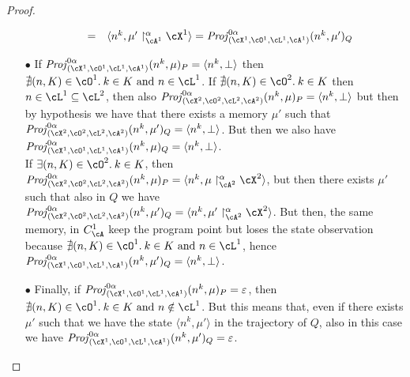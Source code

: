 \documentclass[prodmode,acmtocl]{acmsmall}
\newcommand{\caX}{\cX}
\def\prog{\ensuremath{P}\xspace}
\def\progq{\ensuremath{Q}\xspace}
\def\memory{\ensuremath{\mu}\xspace}
\def\crit{\ensuremath{C}\xspace}
\newcommand{\ABSMEM}[3]{#1 \upharpoonright^\alpha_{#3} #2}
\def\Proj{\ensuremath{\mathit{Proj}}\xspace}
\def\tuple#1{\langle #1 \rangle}
\newcommand{\0}{\mbox{\bf 0}}
\begin{document}
\begin{proof}
\begin{itemize}
\[\begin{array}{lll}
    &=&\tuple{n^k,\ABSMEM{\memory'}{\caX^1}{\cA^1}}=
        \Proj^{0\alpha}_{(\caX^1, \cO^1, \cL^1,
    \cA^1)}(n^k, \memory')_\progq
    \end{array}
    \]
  \item[$\bullet$] If $\Proj^{0\alpha}_{(\caX^1, \cO^1, \cL^1,
    \cA^1)}(n^k, \memory)_\prog=\tuple{n^k,\bot}$ then $\nexists(n,K)
    \in \cO^1.\:k \in K\mbox{ and }n\in \cL^1$. If $\nexists(n,K) \in
    \cO^2.\:k \in K$ then $n\in\cL^1\subseteq\cL^2$, then also
    $\Proj^{0\alpha}_{(\caX^2, \cO^2, \cL^2, \cA^2)}(n^k,
    \memory)_\prog=\tuple{n^k,\bot}$ but then by hypothesis we have
    that there exists a memory $\memory'$ such that
    $\Proj^{0\alpha}_{(\caX^2, \cO^2, \cL^2, \cA^2)}(n^k,
    \memory')_\progq=\tuple{n^k,\bot}$. But then we also have
    $\Proj^{0\alpha}_{(\caX^1, \cO^1, \cL^1, \cA^1)}(n^k,
    \memory)_\progq=\tuple{n^k,\bot}$.\\ If $\exists(n,K) \in
    \cO^2.\:k \in K$, then $\Proj^{0\alpha}_{(\caX^2, \cO^2, \cL^2,
      \cA^2)}(n^k,
    \memory)_\prog=\tuple{n^k,\ABSMEM{\memory}{\caX^2}{\cA^2}}$, but
    then there exists $\memory'$ such that also in $\progq$ we have
    $\Proj^{0\alpha}_{(\caX^2, \cO^2, \cL^2, \cA^2)}(n^k,
    \memory')_\progq=\tuple{n^k,\ABSMEM{\memory'}{\caX^2}{\cA^2}}$. But
    then, the same memory, in $\crit_\cA^1$ keep the program point but
    loses the state observation because $\nexists(n,K) \in \cO^1.\:k
    \in K\mbox{ and }n\in \cL^1$, hence $\Proj^{0\alpha}_{(\caX^1,
      \cO^1, \cL^1, \cA^1)}(n^k, \memory')_\progq=\tuple{n^k,\bot}$.
   \item[$\bullet$] Finally, if $\Proj^{0\alpha}_{(\caX^1, \cO^1,
     \cL^1, \cA^1)}(n^k, \memory)_\prog= \varepsilon$, then
     $\nexists(n,K) \in \cO^1.\:k \in K\mbox{ and }n\notin \cL^1$. But
     this means that, even if there exists $\memory'$ such that we
     have the state $\tuple{n^k,\memory'}$ in the trajectory of
     $\progq$, also in this case we have $\Proj^{0\alpha}_{(\caX^1,
       \cO^1, \cL^1, \cA^1)}(n^k, \memory')_\progq= \varepsilon$.
  \end{itemize}
\end{proof}
\end{document}
